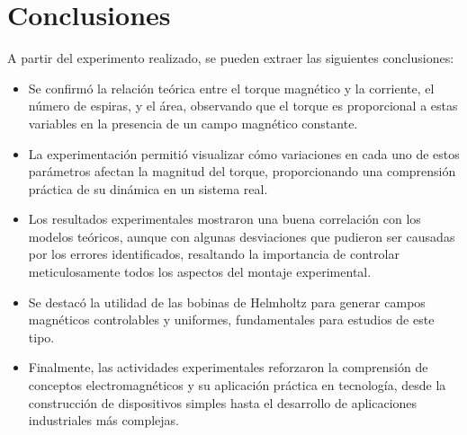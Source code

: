 \section{Conclusiones}
A partir del experimento realizado, se pueden extraer las siguientes conclusiones:
\begin{itemize}
    \item Se confirmó la relación teórica entre el torque magnético y la corriente, el número de espiras, y el área, observando que el torque es proporcional a estas variables en la presencia de un campo magnético constante.
    \item La experimentación permitió visualizar cómo variaciones en cada uno de estos parámetros afectan la magnitud del torque, proporcionando una comprensión práctica de su dinámica en un sistema real.
    \item Los resultados experimentales mostraron una buena correlación con los modelos teóricos, aunque con algunas desviaciones que pudieron ser causadas por los errores identificados, resaltando la importancia de controlar meticulosamente todos los aspectos del montaje experimental.
    \item Se destacó la utilidad de las bobinas de Helmholtz para generar campos magnéticos controlables y uniformes, fundamentales para estudios de este tipo.
    \item Finalmente, las actividades experimentales reforzaron la comprensión de conceptos electromagnéticos y su aplicación práctica en tecnología, desde la construcción de dispositivos simples hasta el desarrollo de aplicaciones industriales más complejas.
\end{itemize}
